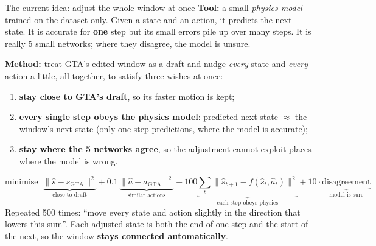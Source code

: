 \documentclass[aspectratio=169,10pt]{beamer}
\begin{document}
\begin{frame}{The current idea: adjust the whole window at once}
\textbf{Tool:} a small \emph{physics model} trained on the dataset only. Given a state and an action, it predicts the next state. It is accurate for \textbf{one} step but its small errors pile up over many steps. It is really 5 small networks; where they disagree, the model is unsure.
\vspace{0.5em}

\textbf{Method:} treat GTA's edited window as a draft and nudge \emph{every} state and \emph{every} action a little, all together, to satisfy three wishes at once:
\begin{enumerate}
\item \textbf{stay close to GTA's draft}, so its faster motion is kept;
\item \textbf{every single step obeys the physics model}: predicted next state $\approx$ the window's next state (only one-step predictions, where the model is accurate);
\item \textbf{stay where the 5 networks agree}, so the adjustment cannot exploit places where the model is wrong.
\end{enumerate}
\[
\text{minimise}\;\; \underbrace{\lVert \hat s - s_{\text{GTA}}\rVert^2}_{\text{close to draft}} + 0.1\,\underbrace{\lVert \hat a - a_{\text{GTA}}\rVert^2}_{\text{similar actions}} + 100\underbrace{\textstyle\sum_t \lVert \hat s_{t+1} - f(\hat s_t,\hat a_t)\rVert^2}_{\text{each step obeys physics}} + 10\cdot\underbrace{\text{disagreement}}_{\text{model is sure}}
\]
\small Repeated 500 times: ``move every state and action slightly in the direction that lowers this sum''. Each adjusted state is both the end of one step and the start of the next, so the window \textbf{stays connected automatically}.
\end{frame}
\end{document}
